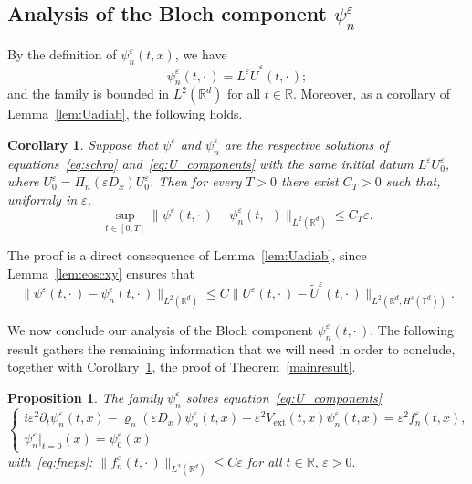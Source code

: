 \documentclass[10pt]{amsart}
\newtheorem{prop}[cdrthm]{Proposition}
\newtheorem{coro}[cdrthm]{Corollary}
\theoremstyle{definition}
\DeclareMathOperator{\ext}{ext}
\newcommand*\R{{\mathbb R}}
\newcommand*\T{{\mathbb T}}
\newcommand*\eps{\varepsilon}
\numberwithin{equation}{section}
\begin{document}
\subsection{Analysis of the Bloch component \texorpdfstring{$\psi^\eps_n$}{psi epsn}}\label{sec:psiepsn}

By the definition of $\psi^\eps_n(t,x)$, we have
\[
\psi^\eps_n(t,\cdot\,)= L^\eps \widetilde U^\eps(t,\cdot\,);
\]
and the family is bounded in $L^2(\R^d)$ for all $t\in\R$. Moreover, as a corollary of Lemma~\ref{lem:Uadiab}, the following holds.

\begin{coro}\label{prop:adiab1}
Suppose that $\psi^\eps$ and $\psi^\eps_n$ are the respective solutions of equations~\eqref{eq:schro} and~\eqref{eq:U_components} with the same initial datum $L^\eps U^\eps_0$, where $U^\eps_0= \Pi_n(\eps D_x) U^\eps_0$. Then for every $T>0$ there exist $C_T>0$ such that, uniformly in $\eps$,
\begin{equation*}
\sup_{t\in[0,T]} \| \psi^\eps(t,\cdot\,)- \psi^\eps_n(t,\cdot\,)\|_{L^2(\R^d)} \leq C_{T}\eps.
\end{equation*}
\end{coro}

The proof is a direct consequence of Lemma~\ref{lem:Uadiab}, since Lemma~\ref{lem:eoscxy} ensures that
\[
\| \psi^\eps(t,\cdot\,)- \psi^\eps_n(t,\cdot\,)\|_{L^2(\R^d)} \leq C \| U^\eps(t,\cdot\,)-\widetilde U^\eps(t,\cdot\,)\|_{L^2(\R^d,H^s(\T^d))}.
\]

We now conclude our analysis of the Bloch component $\psi^\eps_n(t,\cdot\,)$. The following result gathers the remaining information that we will need in order to conclude, together with Corollary~\ref{prop:adiab1}, the proof of Theorem~\ref{mainresult}.

\begin{prop}\label{lem:decompsolution}
The family $\psi_n^\eps$ solves equation~\eqref{eq:U_components}
\[
\begin{cases}
i\eps^2 \partial_{t} \psi^\eps_{n} (t,x)- \varrho_{n}(\eps D_x) \psi^\eps_{n}(t,x)- \eps^2 V_{\ext}(t,x) \psi^\eps_{n}(t,x)= \eps^2 f^\eps_n(t,x),\\
\psi^\eps_{n}|_{t=0}(x)= \psi_{0}^{\eps}(x)
\end{cases}
\]
with~\eqref{eq:fneps}: $\|f^\eps_n(t,\cdot\,)\|_{L^2(\R^d)}\leq C\eps$ for all $t\in\R,\,\eps>0.$
\end{prop}
\end{document}
